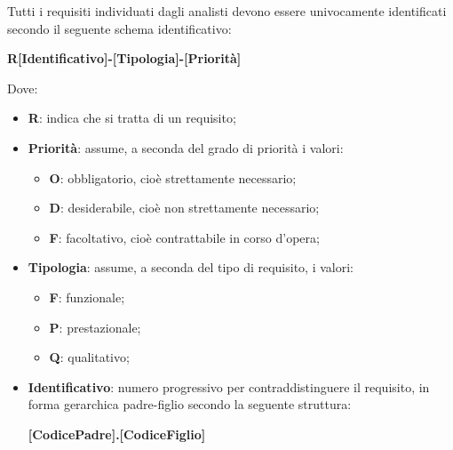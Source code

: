 Tutti i requisiti individuati dagli analisti devono essere univocamente identificati secondo il seguente schema identificativo:

\begin{center}
    \textbf{R[Identificativo]-[Tipologia]-[Priorit\`{a}]}
\end{center}

Dove:

\begin{itemize}
    \item \textbf{R}: indica che si tratta di un requisito;
    \item \textbf{Priorit\`{a}}: assume, a seconda del grado di priorit\`{a} i valori:
    \begin{itemize}
        \item \textbf{O}: obbligatorio, cio\`{e} strettamente necessario;
        \item \textbf{D}: desiderabile, cio\`{e} non strettamente necessario;
        \item \textbf{F}: facoltativo, cio\`{e} contrattabile in corso d'opera;
    \end{itemize}
    \item \textbf{Tipologia}: assume, a seconda del tipo di requisito, i valori:
    \begin{itemize}
        \item \textbf{F}: funzionale;
        \item \textbf{P}: prestazionale;
        \item \textbf{Q}: qualitativo;
    \end{itemize}
    \item \textbf{Identificativo}: numero progressivo per contraddistinguere il requisito, in forma gerarchica padre-figlio secondo la seguente struttura:
    \begin{center}
        \textbf{[CodicePadre].[CodiceFiglio]}
    \end{center}
\end{itemize}